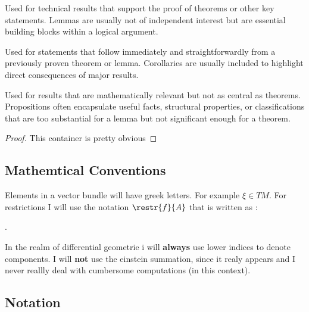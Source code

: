 \begin{lemma}[An Example]
	Used for technical results that support the proof of theorems or other key statements. Lemmas are usually not of independent interest but are essential building blocks within a logical argument.
\end{lemma}
\begin{corollary}[An Example]
	Used for statements that follow immediately and straightforwardly from a previously proven theorem or lemma. Corollaries are usually included to highlight direct consequences of major results.
\end{corollary}
\begin{proposition}[An Example]
	Used for results that are mathematically relevant but not as central as theorems. Propositions often encapsulate useful facts, structural properties, or classifications that are too substantial for a lemma but not significant enough for a theorem.
\end{proposition}
\begin{proof}
	This container is pretty obvious
\end{proof}
\subsection{Mathemtical Conventions}
Elements in a vector bundle will have greek letters. For example $\xi\in TM$. For restrictions I will use the notation $\restr{f}{A}$ that is written as :
\begin{verbatim*}.\end{verbatim*}
In the realm of differential geometrie i will \textbf{always} use lower indices to denote components. I will \textbf{not} use the einstein summation, since it realy appears and I never reallly deal with cumbersome computations (in this context). 
\subsection{Notation}


